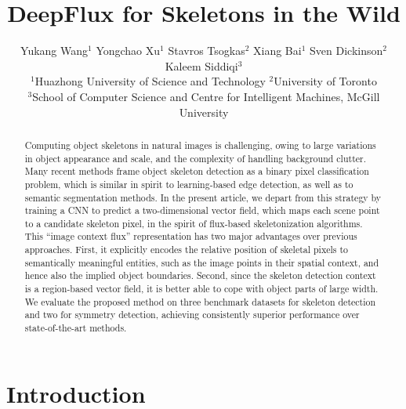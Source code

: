 \documentclass[10pt,twocolumn,letterpaper]{article}
\begin{document}
\title{DeepFlux for Skeletons in the Wild}

\author{
Yukang Wang$^1$ \quad Yongchao Xu$^1$ \quad Stavros Tsogkas$^2$ \quad Xiang Bai$^1$ \quad Sven Dickinson$^2$ \quad Kaleem Siddiqi$^3$
\\[0.2cm]
$^1$Huazhong University of Science and Technology
\quad
$^2$University of Toronto
\\
$^3$School of Computer Science and Centre for Intelligent Machines, McGill University
}

\maketitle


\begin{abstract}




Computing object skeletons in natural images is challenging, owing to large variations in object appearance and scale, and the complexity of handling background clutter. Many recent methods frame object skeleton detection as a binary pixel classification problem, which is similar in spirit to learning-based edge detection, as well as to semantic segmentation methods. In the present article, we depart from this strategy by training a CNN to predict a two-dimensional vector field, which maps each scene point to a candidate skeleton pixel, in the spirit of flux-based skeletonization algorithms. This ``image context flux'' representation has two major advantages over previous approaches. First, it explicitly encodes the relative position of skeletal pixels to semantically meaningful entities, such as the image points in their spatial context, and hence also the implied object boundaries. Second, since the skeleton detection context is a region-based vector field, it is better able to cope with object parts of large width.
We evaluate the proposed method on three benchmark datasets for skeleton detection and two for symmetry detection, achieving consistently superior performance over state-of-the-art methods.
\end{abstract}

\section{Introduction} \label{sec:intro}
\end{document}
